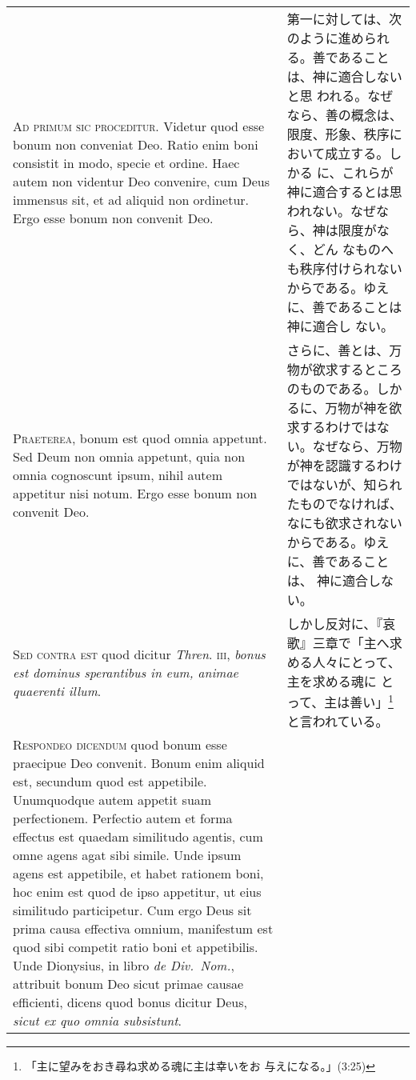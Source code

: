 \documentclass[10pt]{jsarticle} %
\begin{document}
\begin{longtable}{p{21em}p{21em}}

{\huge A}{\scshape d primum sic proceditur}. Videtur quod esse bonum non
 conveniat Deo. Ratio enim boni consistit in modo, specie et
 ordine. Haec autem non videntur Deo convenire, cum Deus immensus sit,
 et ad aliquid non ordinetur. Ergo esse bonum non convenit Deo.

&

第一に対しては、次のように進められる。善であることは、神に適合しないと思
 われる。なぜなら、善の概念は、限度、形象、秩序において成立する。しかる
 に、これらが神に適合するとは思われない。なぜなら、神は限度がなく、どん
 なものへも秩序付けられないからである。ゆえに、善であることは神に適合し
 ない。


\\

{\scshape Praeterea}, bonum est quod omnia appetunt. Sed Deum non omnia
 appetunt, quia non omnia cognoscunt ipsum, nihil autem appetitur nisi
 notum. Ergo esse bonum non convenit Deo.

&

さらに、善とは、万物が欲求するところのものである。しかるに、万物が神を欲
 求するわけではない。なぜなら、万物が神を認識するわけではないが、知られ
 たものでなければ、なにも欲求されないからである。ゆえに、善であることは、
 神に適合しない。

\\

{\scshape Sed contra est} quod dicitur {\itshape Thren}. {\scshape iii},
 {\itshape bonus est dominus sperantibus in eum, animae quaerenti
 illum}.

&

しかし反対に、『哀歌』三章で「主へ求める人々にとって、主を求める魂に
 とって、主は善い」\footnote{「主に望みをおき尋ね求める魂に主は幸いをお
 与えになる。」(3:25)}と言われている。


\\

{\scshape Respondeo dicendum} quod bonum esse praecipue Deo
 convenit. Bonum enim aliquid est, secundum quod est
 appetibile. Unumquodque autem appetit suam perfectionem. Perfectio
 autem et forma effectus est quaedam similitudo agentis, cum omne agens
 agat sibi simile. Unde ipsum agens est appetibile, et habet rationem
 boni, hoc enim est quod de ipso appetitur, ut eius similitudo
 participetur. Cum ergo Deus sit prima causa effectiva omnium,
 manifestum est quod sibi competit ratio boni et appetibilis. Unde
 Dionysius, in libro {\itshape de Div.~Nom.}, attribuit bonum Deo sicut primae
 causae efficienti, dicens quod bonus dicitur Deus, {\itshape sicut ex quo omnia
 subsistunt}.


\end{longtable}
\end{document}
